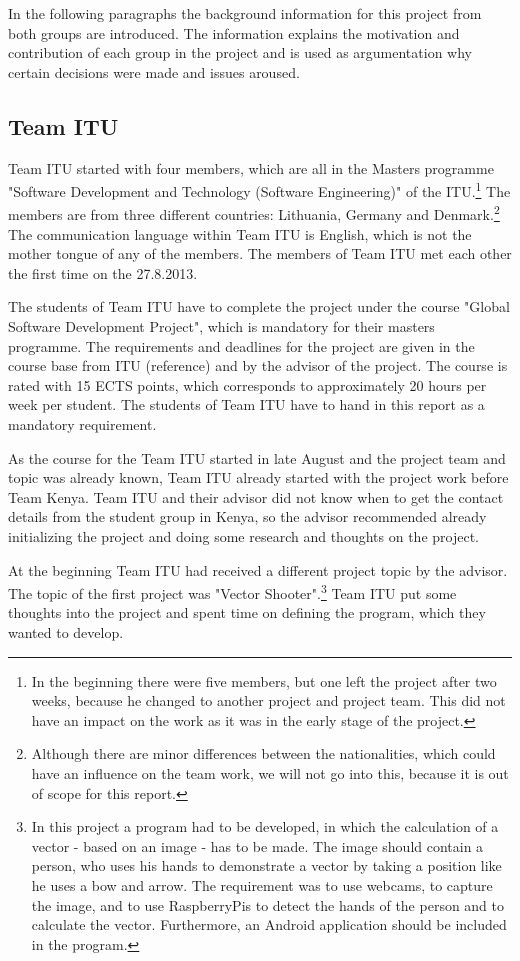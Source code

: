 In the following paragraphs the background information for this project from both groups are introduced. The information explains the motivation and contribution of each group in the project and is used as argumentation why certain decisions were made and issues aroused.


\subsection{Team ITU}
Team ITU started with four members, which are all in the Masters programme "Software Development and Technology (Software Engineering)" of the ITU.\footnote{In the beginning there were five members, but one left the project after two weeks, because he changed to another project and project team. This did not have an impact on the work as it was in the early stage of the project.} The members are from three different countries: Lithuania, Germany and Denmark.\footnote{Although there are minor differences between the nationalities, which could have an influence on the team work, we will not go into this, because it is out of scope for this report.} The communication language within Team ITU is English, which is not the mother tongue of any of the members. The members of Team ITU met each other the first time on the 27.8.2013.

The students of Team ITU have to complete the project under the course "Global Software Development Project", which is mandatory for their masters programme. The requirements and deadlines for the project are given in the course base from ITU (reference) and by the advisor of the project. The course is rated with 15 ECTS points, which corresponds to approximately 20 hours per week per student. The students of Team ITU have to hand in this report as a mandatory requirement.

As the course for the Team ITU started in late August and the project team and topic was already known, Team ITU already started with the project work before Team Kenya. Team ITU and their advisor did not know when to get the contact details from the student group in Kenya, so the advisor recommended already initializing the project and doing some research and thoughts on the project.

At the beginning Team ITU had received a different project topic by the advisor. The topic of the first project was "Vector Shooter".\footnote{In this project a program had to be developed, in which the calculation of a vector - based on an image - has to be made. The image should contain a person, who uses his hands to demonstrate a vector by taking a position like he uses a bow and arrow. The requirement was to use webcams, to capture the image, and to use RaspberryPis to detect the hands of the person and to calculate the vector. Furthermore, an Android application should be included in the program.} Team ITU put some thoughts into the project and spent time on defining the program, which they wanted to develop.

